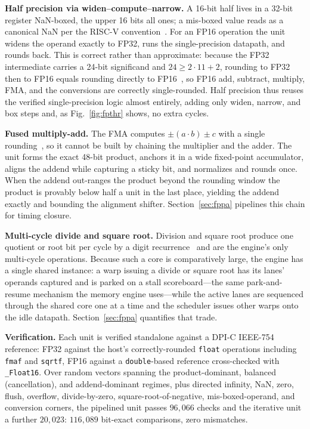 \documentclass[10pt,conference]{IEEEtran}
\begin{document}
\textbf{Half precision via widen--compute--narrow.} A 16-bit half lives in a
32-bit register NaN-boxed, the upper 16 bits all ones; a mis-boxed value reads as
a canonical NaN per the RISC-V convention~\cite{riscv}. For an FP16 operation the
unit widens the operand exactly to FP32, runs the single-precision datapath, and
rounds back. This is correct rather than approximate: because the FP32
intermediate carries a 24-bit significand and $24\ge 2\cdot11+2$, rounding to FP32
then to FP16 equals rounding directly to FP16~\cite{figueroa}, so FP16 add,
subtract, multiply, FMA, and the conversions are correctly single-rounded. Half
precision thus reuses the verified single-precision logic almost entirely, adding
only widen, narrow, and box steps and, as Fig.~\ref{fig:fpthr} shows, no extra
cycles.

\textbf{Fused multiply-add.} The FMA computes $\pm(a\cdot b)\pm c$ with a single
rounding~\cite{muller}, so it cannot be built by chaining the multiplier and the
adder. The unit forms the exact 48-bit product, anchors it in a wide fixed-point
accumulator, aligns the addend while capturing a sticky bit, and normalizes and
rounds once. When the addend out-ranges the product beyond the rounding window the
product is provably below half a unit in the last place, yielding the addend
exactly and bounding the alignment shifter. Section~\ref{sec:fppa} pipelines this
chain for timing closure.

\textbf{Multi-cycle divide and square root.} Division and square root produce one
quotient or root bit per cycle by a digit recurrence~\cite{ercegovac} and are the
engine's only multi-cycle operations. Because such a core is comparatively large,
the engine has a single shared instance: a warp issuing a divide or square root
has its lanes' operands captured and is parked on a stall scoreboard---the same
park-and-resume mechanism the memory engine uses---while the active lanes are
sequenced through the shared core one at a time and the scheduler issues other
warps onto the idle datapath. Section~\ref{sec:fppa} quantifies that trade.

\textbf{Verification.} Each unit is verified standalone against a DPI-C IEEE-754
reference: FP32 against the host's correctly-rounded \texttt{float} operations
including \texttt{fmaf} and \texttt{sqrtf}, FP16 against a \texttt{double}-based
reference cross-checked with \texttt{\_Float16}. Over random vectors spanning the
product-dominant, balanced (cancellation), and addend-dominant regimes, plus
directed infinity, NaN, zero, flush, overflow, divide-by-zero,
square-root-of-negative, mis-boxed-operand, and conversion corners, the pipelined
unit passes $96{,}066$ checks and the iterative unit a further $20{,}023$:
$116{,}089$ bit-exact comparisons, zero mismatches.
\end{document}
